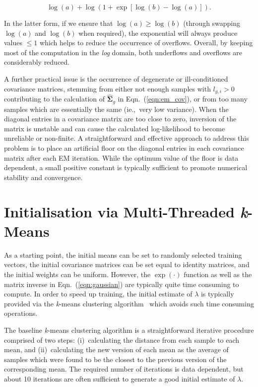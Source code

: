 \documentclass[10pt,a4paper]{article}
\def\Mat#1{{\boldsymbol{#1}}}
\begin{document}
\vspace{-3ex}
\begin{equation}
\log(a) + \log\left( 1 + \exp\left[ \log(b) - \log(a) \right] \right).
\end{equation}

\vspace{-1ex}
In the latter form, if we ensure that {$\log(a) \geq \log(b)$} (through swapping $\log(a)$ and $\log(b)$ when required),
the exponential will always produce values $\leq 1$ which helps to reduce the occurrence of overflows.
Overall, by keeping most of the computation in the {\it log} domain, 
both underflows and overflows are considerably reduced.

A further practical issue is the occurrence of \mbox{degenerate} or ill-conditioned covariance matrices,
stemming from either not enough samples with $l_{g,i} > 0$ contributing to the calculation of $\widehat{\Mat{\Sigma}}_g$ in Eqn.~(\ref{eqn:em_cov}),
or from too many samples which are essentially the same (ie.,~very low variance).
When the diagonal entries in a covariance matrix are too close to zero,
inversion of the matrix is unstable and can cause the calculated log-likelihood to become unreliable
or non-finite.
A straightforward and effective approach to address this problem is to place an artificial floor
on the diagonal entries in each covariance matrix after each EM iteration.
While the optimum value of the floor is data dependent, a small positive constant is typically sufficient to promote numerical stability
and convergence.



\section{Initialisation via Multi-Threaded {\it k}-Means}
\label{sec:param_km}

As a starting point, the initial means can be set to randomly selected training vectors,
the initial covariance matrices can be set equal to identity matrices, 
and the initial weights can be uniform.
However, the $\exp(\cdot)$ function as well as the matrix inverse in Eqn.~(\ref{eqn:gaussian}) are typically quite time consuming to compute.
In order to speed up training, the initial estimate of $\lambda$ is typically provided via the {\it k}-means clustering algorithm~\cite{Bishop_2006,Duda01,Kulis_2012}
which avoids such time consuming operations.

The baseline {\it k}-means clustering algorithm is a straightforward iterative procedure comprised of two steps:
(i)~calculating the distance from each sample to each mean,
and
(ii)~calculating the new version of each mean as the average of samples which were found to be the closest to the previous version of the corresponding mean.
The required number of iterations is data dependent,
but about 10 iterations are often sufficient to generate a good initial estimate of $\lambda$.
\end{document}
